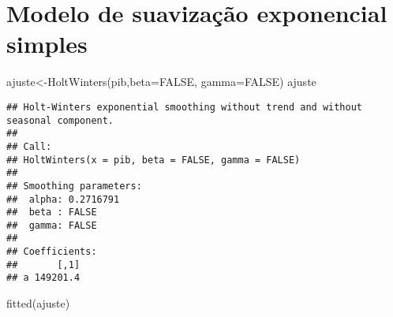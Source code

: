 \documentclass[
]{article}
\newenvironment{Shaded}{\begin{snugshade}}{\end{snugshade}}
\newcommand{\AttributeTok}[1]{\textcolor[rgb]{0.77,0.63,0.00}{#1}}
\newcommand{\ConstantTok}[1]{\textcolor[rgb]{0.00,0.00,0.00}{#1}}
\newcommand{\FunctionTok}[1]{\textcolor[rgb]{0.00,0.00,0.00}{#1}}
\newcommand{\NormalTok}[1]{#1}
\newcommand{\OtherTok}[1]{\textcolor[rgb]{0.56,0.35,0.01}{#1}}
\begin{document}
\hypertarget{modelo-de-suavizauxe7uxe3o-exponencial-simples}{%
\section{Modelo de suavização exponencial
simples}\label{modelo-de-suavizauxe7uxe3o-exponencial-simples}}

\begin{Shaded}
\begin{Highlighting}[]
\NormalTok{ajuste}\OtherTok{\textless{}{-}}\FunctionTok{HoltWinters}\NormalTok{(pib,}\AttributeTok{beta=}\ConstantTok{FALSE}\NormalTok{, }\AttributeTok{gamma=}\ConstantTok{FALSE}\NormalTok{)}
\NormalTok{ajuste}
\end{Highlighting}
\end{Shaded}

\begin{verbatim}
## Holt-Winters exponential smoothing without trend and without seasonal component.
## 
## Call:
## HoltWinters(x = pib, beta = FALSE, gamma = FALSE)
## 
## Smoothing parameters:
##  alpha: 0.2716791
##  beta : FALSE
##  gamma: FALSE
## 
## Coefficients:
##       [,1]
## a 149201.4
\end{verbatim}

\begin{Shaded}
\begin{Highlighting}[]
\FunctionTok{fitted}\NormalTok{(ajuste)}
\end{Highlighting}
\end{Shaded}
\end{document}
